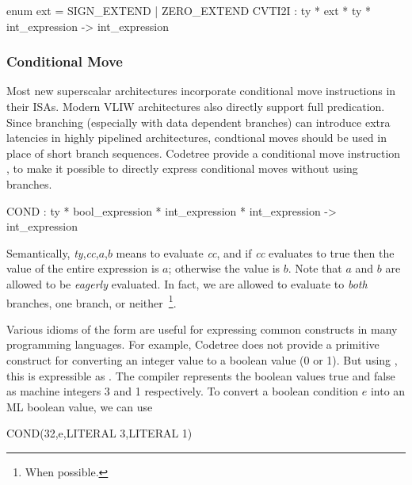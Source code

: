 \begin{SML}
    enum ext = SIGN_EXTEND | ZERO_EXTEND
    CVTI2I : ty * ext * ty * int_expression -> int_expression 
\end{SML}

\subsubsection{Conditional Move} \label{sec:cond-move}
Most new superscalar architectures incorporate conditional move 
instructions in their ISAs.  
Modern VLIW architectures also directly support full predication.  
Since branching (especially with data dependent branches) can
introduce extra latencies in highly pipelined architectures,
condtional moves should be used in place of short branch sequences. 
Codetree provide a conditional move instruction ,
to make it possible to directly express conditional moves without using
branches. 
\begin{SML}
   COND : ty * bool_expression * int_expression * int_expression -> int_expression
\end{SML}

Semantically, \emph{ty},\emph{cc},$a$,$b$\sml{)} means to evaluate
\emph{cc}, and if \emph{cc} evaluates to true then the value of the entire expression is
$a$; otherwise the value is $b$.  Note that $a$ and $b$ are allowed to be
\emph{eagerly}
evaluated.  In fact, we are allowed to evaluate to \emph{both}
branches, one branch, or neither~\footnote{When possible.}. 

Various idioms of the  form are useful for expressing common
constructs in many programming languages.  For example, Codetree does not
provide a primitive construct for converting an integer value  to a
boolean value (0 or 1).  But using , this is expressible as
.  The compiler represents
the boolean values true and false as machine integers 3 and 1 respectively.
To convert a boolean condition $e$ into an ML boolean value, we can use
\begin{SML}
   COND(32,e,LITERAL 3,LITERAL 1)
\end{SML}

